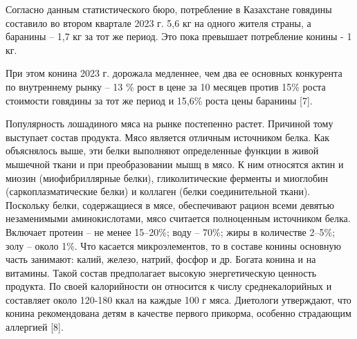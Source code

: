 \begin{multicols}{2}
Согласно данным статистического бюро, потребление в Казахстане говядины
составило во втором квартале 2023 г. 5,6 кг на одного жителя страны, а
баранины -- 1,7 кг за тот же период. Это пока превышает потребление
конины - 1 кг.

При этом конина 2023 г. дорожала медленнее, чем два ее основных
конкурента по внутреннему рынку -- 13 \% рост в цене за 10 месяцев
против 15\% роста стоимости говядины за тот же период и 15,6\% роста
цены баранины {[}7{]}.

Популярность лошадиного мяса на рынке постепенно растет. Причиной тому
выступает состав продукта. Мясо является отличным источником белка. Как
объяснялось выше, эти белки выполняют определенные функции в живой
мышечной ткани и при преобразовании мышц в мясо. К ним относятся актин и
миозин (миофибриллярные белки), гликолитические ферменты и миоглобин
(саркоплазматические белки) и коллаген (белки соединительной ткани).
Поскольку белки, содержащиеся в мясе, обеспечивают рацион всеми девятью
незаменимыми аминокислотами, мясо считается полноценным источником
белка. Включает протеин -- не менее 15--20\%; воду -- 70\%; жиры в
количестве 2--5\%; золу -- около 1\%. Что касается микроэлементов, то в
составе конины основную часть занимают: калий, железо, натрий, фосфор и
др. Богата конина и на витамины. Такой состав предполагает высокую
энергетическую ценность продукта. По своей калорийности он относится к
числу среднекалорийных и составляет около 120-180 ккал на каждые 100 г
мяса. Диетологи утверждают, что конина рекомендована детям в качестве
первого прикорма, особенно страдающим аллергией {[}8{]}.


\end{multicols}
